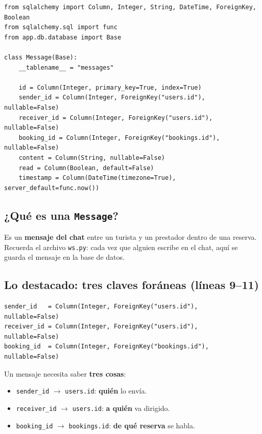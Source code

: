 \documentclass[11pt,a4paper]{article}
\begin{document}
\begin{lstlisting}
from sqlalchemy import Column, Integer, String, DateTime, ForeignKey, Boolean
from sqlalchemy.sql import func
from app.db.database import Base

class Message(Base):
    __tablename__ = "messages"

    id = Column(Integer, primary_key=True, index=True)
    sender_id = Column(Integer, ForeignKey("users.id"), nullable=False)
    receiver_id = Column(Integer, ForeignKey("users.id"), nullable=False)
    booking_id = Column(Integer, ForeignKey("bookings.id"), nullable=False)
    content = Column(String, nullable=False)
    read = Column(Boolean, default=False)
    timestamp = Column(DateTime(timezone=True), server_default=func.now())
\end{lstlisting}

\subsection{¿Qué es una \texttt{Message}?}

Es un \textbf{mensaje del chat} entre un turista y un prestador dentro de una reserva.
Recuerda el archivo \texttt{ws.py}: cada vez que alguien escribe en el chat, aquí se guarda
el mensaje en la base de datos.

\subsection{Lo destacado: \textbf{tres} claves foráneas (líneas 9--11)}

\begin{lstlisting}
sender_id   = Column(Integer, ForeignKey("users.id"),    nullable=False)
receiver_id = Column(Integer, ForeignKey("users.id"),    nullable=False)
booking_id  = Column(Integer, ForeignKey("bookings.id"), nullable=False)
\end{lstlisting}

Un mensaje necesita saber \textbf{tres cosas}:
\begin{itemize}
    \item \texttt{sender\_id} $\rightarrow$ \texttt{users.id}: \textbf{quién} lo envía.
    \item \texttt{receiver\_id} $\rightarrow$ \texttt{users.id}: \textbf{a quién} va dirigido.
    \item \texttt{booking\_id} $\rightarrow$ \texttt{bookings.id}: \textbf{de qué reserva} se habla.
\end{itemize}
\end{document}
